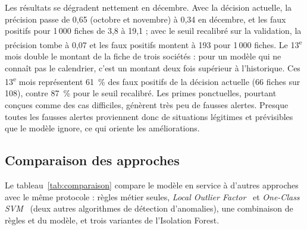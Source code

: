Les résultats se dégradent nettement en décembre. Avec la décision actuelle, la précision passe de 0,65 (octobre et novembre) à 0,34 en décembre, et les faux positifs pour 1\,000 fiches de 3,8 à 19,1 ; avec le seuil recalibré sur la validation, la précision tombe à 0,07 et les faux positifs montent à 193 pour 1\,000 fiches. Le 13\textsuperscript{e} mois double le montant de la fiche de trois sociétés : pour un modèle qui ne connaît pas le calendrier, c'est un montant deux fois supérieur à l'historique. Ces 13\textsuperscript{e} mois représentent 61~\% des faux positifs de la décision actuelle (66 fiches sur 108), contre 87~\% pour le seuil recalibré. Les primes ponctuelles, pourtant conçues comme des cas difficiles, génèrent très peu de fausses alertes. Presque toutes les fausses alertes proviennent donc de situations légitimes et prévisibles que le modèle ignore, ce qui oriente les améliorations.

\subsection{Comparaison des approches}

Le tableau~\ref{tab:comparaison} compare le modèle en service à d'autres approches avec le même protocole : règles métier seules, \textit{Local Outlier Factor}~\cite{breunig2000lof} et \textit{One-Class SVM}~\cite{scholkopf2001ocsvm} (deux autres algorithmes de détection d'anomalies), une combinaison de règles et du modèle, et trois variantes de l'Isolation Forest.

